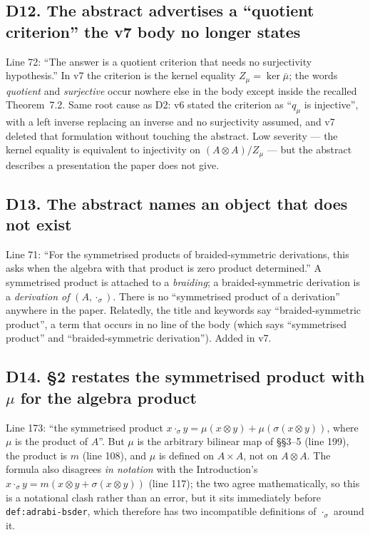 \documentclass[11pt,a4paper]{article}
\newcommand{\cpt}[1]{\texttt{#1}}          %
\begin{document}
\subsection*{D12. The abstract advertises a ``quotient criterion'' the v7 body no longer states}
Line 72: ``The answer is a quotient criterion that needs no surjectivity hypothesis.'' In v7 the
criterion is the kernel equality $Z_\mu=\ker\bar\mu$; the words \emph{quotient} and \emph{surjective}
occur nowhere else in the body except inside the recalled Theorem~7.2. Same root cause as D2: v6 stated
the criterion as ``$q_\mu$ is injective'', with a left inverse replacing an inverse and no surjectivity
assumed, and v7 deleted that formulation without touching the abstract. Low severity --- the kernel
equality is equivalent to injectivity on $(A\otimes A)/Z_\mu$ --- but the abstract describes a
presentation the paper does not give.

\subsection*{D13. The abstract names an object that does not exist}
Line 71: ``For the symmetrised products of braided-symmetric derivations, this asks when the algebra with
that product is zero product determined.'' A symmetrised product is attached to a \emph{braiding}; a
braided-symmetric derivation is a \emph{derivation of} $(A,\cdot_\sigma)$. There is no ``symmetrised
product of a derivation'' anywhere in the paper. Relatedly, the title and keywords say
``braided-symmetric product'', a term that occurs in no line of the body (which says ``symmetrised
product'' and ``braided-symmetric derivation''). Added in v7.

\subsection*{D14. \S2 restates the symmetrised product with $\mu$ for the algebra product}
Line 173: ``the symmetrised product $x\cdot_\sigma y=\mu(x\otimes y)+\mu(\sigma(x\otimes y))$, where
$\mu$ is the product of $A$''. But $\mu$ is the arbitrary bilinear map of \S\S3--5 (line 199), the product
is $m$ (line 108), and $\mu$ is defined on $A\times A$, not on $A\otimes A$. The formula also disagrees
\emph{in notation} with the Introduction's $x\cdot_\sigma y=m(x\otimes y+\sigma(x\otimes y))$ (line 117);
the two agree mathematically, so this is a notational clash rather than an error, but it sits
immediately before \cpt{def:adrabi-bsder}, which therefore has two incompatible definitions of
$\cdot_\sigma$ around it.
\end{document}
